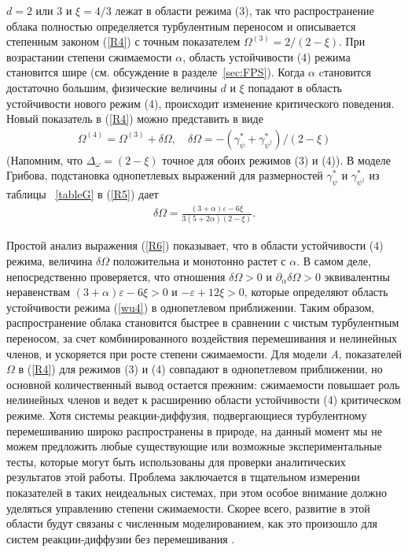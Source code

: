 \documentclass[a4paper,10pt]{article}
\begin{document}
 $d=2$ или 3  и $\xi=4/3$ лежат в области режима (3), так что
 распространение облака полностью определяется турбулентным переносом и описывается степенным законом (\ref{R4}) с точным показателем  $\Omega^{(3)}= 2/(2-\xi)$.
При возрастании степени сжимаемости $\alpha$, область устойчивости (4) режима становится шире (см. обсуждение в разделе~\ref{sec:FPS}).
Когда $\alpha$ cтановится достаточно большим, физические величины  $d$ и $\xi$  попадают в область устойчивости нового режим (4), происходит изменение критического поведения.
Новый показатель в (\ref{R4}) можно представить в виде 
\begin{eqnarray}
\Omega^{(4)}= \Omega^{(3)} + \delta\Omega, \quad
\delta\Omega = - (\gamma_{\psi}^{*}+\gamma_{\psi^{\dag}}^{*}) / (2-\xi)
\label{R5}
\end{eqnarray}
(Напомним, что  $\Delta_{\omega}=(2-\xi)$ точное для обоих режимов (3) и (4)).
В моделе Грибова, подстановка однопетлевых выражений для размерностей $\gamma_{\psi}^{*}$ и $\gamma_{\psi^{\dag}}^{*}$ из таблицы ~\ref{tableG} в (\ref{R5}) дает 
\begin{eqnarray}
\delta\Omega = \frac{(3+\alpha)\varepsilon-6\xi}{3(5+2\alpha)(2-\xi)}.
\label{R6}
\end{eqnarray}

Простой анализ выражения (\ref{R6}) показывает, что в области устойчивости (4) режима, величина $\delta\Omega$ положительна и монотонно растет с $\alpha$.
В самом деле, непосредственно проверяется, что отношения $\delta\Omega>0$
и $\partial_{\alpha}\delta\Omega>0$ эквивалентны неравенствам $(3+\alpha)\varepsilon-6\xi>0$ и $-\varepsilon+12\xi>0$, 
которые определяют область устойчивости режима (\ref{wu4}) в однопетлевом приближении.
Таким образом, распространение облака становится быстрее в сравнении с чистым турбулентным переносом, 
за счет комбинированного воздействия перемешивания и нелинейных членов, и ускоряется при росте степени сжимаемости.
Для модели {\it A}, показателей $\Omega$ в (\ref{R4}) для режимов (3) и (4) совпадают в однопетлевом приближении, но основной количественный вывод остается прежним: 
сжимаемости повышает роль нелинейных членов и ведет к расширению области устойчивости (4) критическом режиме.
Хотя системы реакции-диффузия, подвергающиеся турбулентному перемешиванию широко распространены в природе, на данный момент мы не можем предложить любые существующие или 
возможные экспериментальные тесты, которые могут быть использованы для проверки аналитических результатов этой работы.
Проблема заключается в тщательном измерении показателей в таких неидеальных системах, при этом особое внимание должно уделяться управлению степени сжимаемости.
Скорее всего, развитие в этой области будут связаны с численным моделированием, как это произошло для систем реакции-диффузии без перемешивания \cite{Hinr}.
\newpage
\end{document}

